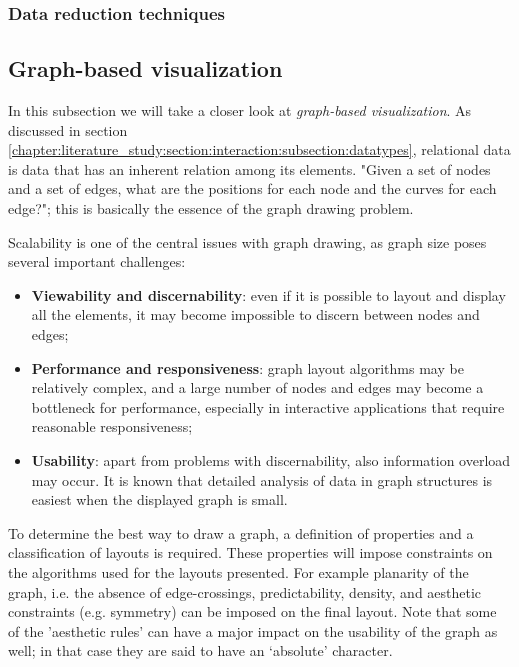 \subsubsection{Data reduction techniques}\label{chapter:literature_study:section:interaction:subsection:techniques:subsubsection:reduction}




\subsection{Graph-based visualization}\label{chapter:literature_study:section:interaction:subsection:graphs}

In this subsection we will take a closer look at \emph{graph-based visualization}. As discussed in section \ref{chapter:literature_study:section:interaction:subsection:datatypes}, relational data is data that has an inherent relation among its elements\cite{shirley:2009}. "Given a set of nodes and a set of edges, what are the positions for each node and the curves for each edge?"; this is basically the essence of the graph drawing problem\cite{herman:2000}.

Scalability is one of the central issues with graph drawing, as graph size poses several important challenges\cite{herman:2000}:

\begin{itemize}
	\item \textbf{Viewability and discernability}: even if it is possible to layout and display all the elements, it may become impossible to discern between nodes and edges;
	\item \textbf{Performance and responsiveness}: graph layout algorithms may be relatively complex, and a large number of nodes and edges may become a bottleneck for performance, especially in interactive applications that require reasonable responsiveness;
	\item \textbf{Usability}: apart from problems with discernability, also information overload may occur. It is known that detailed analysis of data in graph structures is easiest when the displayed graph is small.
\end{itemize}

To determine the best way to draw a graph, a definition of properties and a classification of layouts is required. These properties will impose constraints on the algorithms used for the layouts presented. For example planarity of the graph, i.e. the absence of edge-crossings, predictability, density, and aesthetic constraints (e.g. symmetry) can be imposed on the final layout. Note that some of the 'aesthetic rules' can have a major impact on the usability of the graph as well; in that case they are said to have an ‘absolute’ character\cite{herman:2000}.


